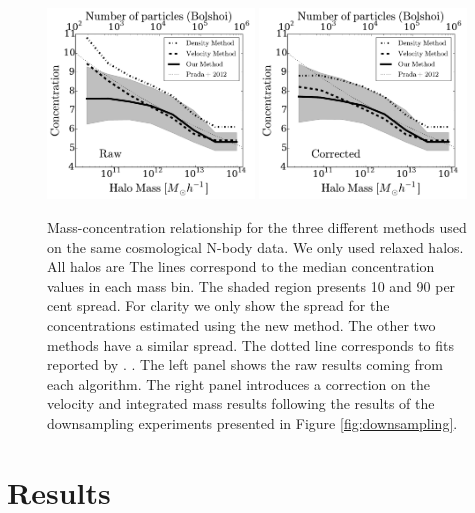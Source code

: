 \documentclass{emulateapj}
\begin{document}
\begin{figure}
\begin{center}
  \includegraphics[width=0.49\textwidth]{concentration_bolshoi.pdf}
  \includegraphics[width=0.49\textwidth]{concentration_bolshoi_corrected.pdf}
\end{center}
\vspace{-0.5cm}
\caption{Mass-concentration relationship for the three different
  methods used on the same cosmological N-body data.  
  We only used relaxed halos.
  All halos are
  The lines correspond to the median concentration values in each mass
  bin.  
  The shaded region presents 10 and 90 per cent spread. 
  For clarity we only show the spread for the concentrations estimated
  using the new method.  
  The other two methods have a similar spread. 
  The dotted line corresponds to fits reported by \citep{Prada2012}.
  \label{fig:concentration}. 
  The left panel shows the raw results coming from each algorithm. 
  The right panel introduces a correction on the velocity and
  integrated mass results following the results of the downsampling
  experiments presented in Figure 
  \ref{fig:downsampling}.} 
\end{figure}


\section{Results}
\label{sec:results}
\end{document}
